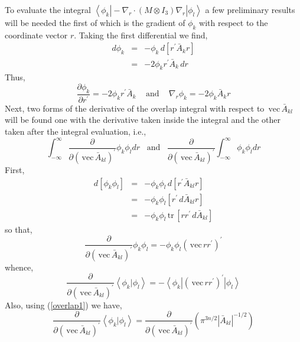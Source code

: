 \documentclass[12pt,thmsa,suthesis,verbatim]{report}
\begin{document}
To evaluate the integral $\left\langle \phi _k\right| -\nabla _r\cdot \left(
M\otimes I_3\right) \nabla _r\left| \phi _l\right\rangle $ a few preliminary
results will be needed the first of which is the gradient of $\phi _k$ with
respect to the coordinate vector $r$. Taking the first differential we find, 
\begin{eqnarray}
d\phi _k &=&-\phi _k\,d\left[ r^{\prime }\bar A_kr\right]  \nonumber \\
\ &=&-2\phi _kr^{\prime }\bar A_k\,dr
\end{eqnarray}
Thus, 
\begin{equation}
\frac{\partial \phi _k}{\partial r^{\prime }}=-2\phi _kr^{\prime }\bar
A_k\;\;\;\text{ and }\;\;\;\nabla _r\phi _k=-2\phi _k\bar A_kr
\label{gradfr}
\end{equation}
Next, two forms of the derivative of the overlap integral with respect to $\,%
\mathrm{vec}\,\bar A_{kl}$ will be found one with the derivative taken
inside the integral and the other taken after the integral evaluation, i.e., 
\begin{equation}
\int_{-\infty }^\infty \frac \partial {\partial \left( \,\mathrm{vec}\,\bar
A_{kl}\right) ^{\prime }}\phi _k\phi _ldr\;\;\;\text{and}\;\;\;\frac
\partial {\partial \left( \,\mathrm{vec}\,\bar A_{kl}\right) ^{\prime
}}\int_{-\infty }^\infty \phi _k\phi _ldr
\end{equation}
First, 
\begin{eqnarray}
d\left[ \phi _k\phi _l\right] &=&-\phi _k\phi _l\,d\left[ r^{\prime }\bar
A_{kl}r\right]  \nonumber \\
\ &=&-\phi _k\phi _l\left[ r^{\prime }\,d\bar A_{kl}r\right]  \nonumber \\
\ &=&-\phi _k\phi _l\,\mathrm{tr}\,\left[ rr^{\prime }\,d\bar A_{kl}\right]
\end{eqnarray}
so that, 
\begin{equation}
\frac \partial {\partial \left( \,\mathrm{vec}\,\bar A_{kl}\right) ^{\prime
}}\phi _k\phi _l=-\phi _k\phi _l\left( \,\mathrm{vec}\,rr^{\prime }\right)
^{\prime }
\end{equation}
whence, 
\begin{equation}
\frac \partial {\partial \left( \,\mathrm{vec}\,\bar A_{kl}\right) ^{\prime
}}\left\langle \phi _k\right. |\left. \phi _l\right\rangle =-\left\langle
\phi _k\right| \left( \,\mathrm{vec}\,rr^{\prime }\right) ^{\prime }\left|
\phi _l\right\rangle  \label{overwrtA1}
\end{equation}
Also, using (\ref{overlap1}) we have, 
\begin{equation}
\frac \partial {\partial \left( \,\mathrm{vec}\,\bar A_{kl}\right) ^{\prime
}}\left\langle \phi _k\right. |\left. \phi _l\right\rangle =\frac \partial
{\partial \left( \,\mathrm{vec}\,\bar A_{kl}\right) ^{\prime }}\left( \pi
^{3n/2}\left| \bar A_{kl}\right| ^{-1/2}\right)
\end{equation}
\end{document}
